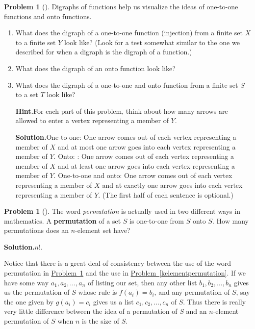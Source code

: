\documentclass[10pt,]{book}
\newcommand{\terminology}[1]{\textbf{#1}}
\theoremstyle{plain}
\theoremstyle{definition}
\newtheorem{activity}[project]{Problem}
\theoremstyle{definition}
\numberwithin{equation}{chapter}
\begin{document}
\begin{activity}[]\label{activity-26}
Digraphs of functions help us visualize the ideas of one-to-one functions and onto functions.%
\begin{enumerate}[font=\bfseries,label=(\alph*),ref=\alph*]
\item\label{task-18} What does the digraph of a one-to-one function (injection) from a finite set \(X\) to a finite set \(Y\) look like? (Look for a test somewhat similar to the one we described for when a digraph is the digraph of a function.)%
\item\label{task-19} What does the digraph of an onto function look like?%
\item\label{bijectiondigraph} What does the digraph of a one-to-one and onto function from a finite set \(S\) to a set \(T\) look like?%
\par\medskip\noindent%
\textbf{Hint.}\quad For each part of this problem, think about how many arrows are allowed to enter a vertex representing a member of \(Y\).%
\par\medskip\noindent%
\textbf{Solution.}\quad One-to-one: One arrow comes out of each vertex representing a member of \(X\) and at most one arrow goes into each vertex representing a member of \(Y\). Onto: : One arrow comes out of each vertex representing a member of \(X\) and at least one arrow goes into each vertex representing a member of \(Y\). One-to-one and onto: One arrow comes out of each vertex representing a member of \(X\) and at exactly one arrow goes into each vertex representing a member of \(Y\). (The first half of each sentence is optional.)%
\end{enumerate}
\end{activity}
\begin{activity}[]\label{permutationasbijection}
The word \emph{permutation} is actually used in two different ways in mathematics. A \terminology{permutation} of a set \(S\) is one-to-one from \(S\) onto \(S\). How many permutations does an \(n\)-element set have?%
\par\medskip\noindent%
\textbf{Solution.}\quad \(n!\).%
\end{activity}
Notice that there is a great deal of consistency between the use of the word permutation in \hyperref[permutationasbijection]{Problem~\ref{permutationasbijection}} and the use in \hyperref[kelementpermutation]{Problem~\ref{kelementpermutation}}. If we have some way \(a_1,a_2,\ldots,a_n\) of listing our set, then any other list \(b_1,b_2,\ldots,b_n\) gives us the permutation of \(S\) whose rule is \(f(a_i) =b_i\), and any permutation of \(S\), say the one given by \(g(a_i)=c_i\) gives us a list \(c_1,c_2,\ldots,c_n\) of \(S\). Thus there is really very little difference between the idea of a permutation of \(S\) and an \(n\)-element permutation of \(S\) when \(n\) is the size of \(S\).%
\typeout{************************************************}
\typeout{************************************************}
\end{document}
